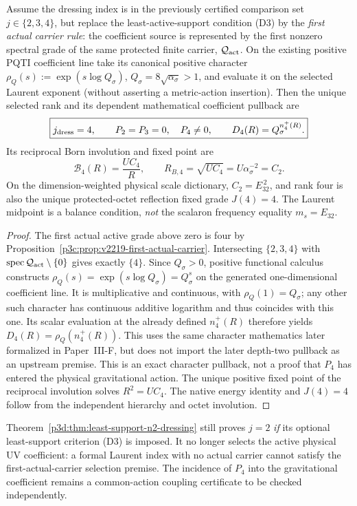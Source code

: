 \documentclass[12pt,a4paper]{article}
\begin{document}
\begin{theorem}
\label{p3d:thm:v2219-carrier-four-dressing}
Assume the dressing index is in the previously certified comparison set
$j\in\{2,3,4\}$, but replace the least-active-support condition (D3) by
the \emph{first actual carrier rule}: the coefficient source is represented
by the first nonzero spectral grade of the same protected finite carrier,
$\mathcal Q_{\rm act}$. On the existing positive PQTI coefficient
line take its canonical positive character
$\rho_Q(s):=\exp(s\log Q_\sigma)$, $Q_\sigma=8\sqrt{\alpha_\sigma}>1$,
and evaluate it on the selected Laurent exponent (without asserting a
metric-action insertion). Then the unique selected rank and its dependent
mathematical coefficient pullback are
\[
 \boxed{j_{\rm dress}=4,\qquad P_2=P_3=0,\quad P_4\ne0,
 \qquad D_4(R)=Q_\sigma^{n_4^+(R)}.}
\]
Its reciprocal Born involution and fixed point are
\[
 \mathcal B_4(R)=\frac{UC_4}{R},\qquad
 R_{B,4}=\sqrt{UC_4}=U\alpha_\sigma^{-2}=C_2.
\]
On the dimension-weighted physical scale dictionary,
$C_2=E_{32}^{\,2}$, and rank four is also the unique protected-octet
reflection fixed grade $J(4)=4$.  The Laurent midpoint is a balance
condition, \emph{not} the scalaron frequency equality $m_s=E_{32}$.
\end{theorem}
\begin{proof}
The first actual active grade above zero is four by
Proposition~\ref{p3c:prop:v2219-first-actual-carrier}. Intersecting
\(\{2,3,4\}\) with \(\operatorname{spec}\mathcal Q_{\rm act}\setminus\{0\}\)
gives exactly \(\{4\}\). Since \(Q_\sigma>0\), positive functional calculus constructs
\(\rho_Q(s)=\exp(s\log Q_\sigma)=Q_\sigma^s\) on the generated
one-dimensional coefficient line. It is multiplicative and continuous,
with \(\rho_Q(1)=Q_\sigma\); any other such character has continuous
additive logarithm and thus coincides with this one.
Its scalar evaluation at the already defined \(n_4^+(R)\) therefore
yields \(D_4(R)=\rho_Q(n_4^+(R))\).
This uses the same character mathematics later formalized in Paper~III-F,
but does not import the later depth-two pullback as an upstream premise.
This is an exact character pullback, not a proof that \(P_4\) has
entered the physical gravitational action. The unique positive fixed point
of the reciprocal involution solves \(R^2=UC_4\). The native energy
identity and \(J(4)=4\) follow from the independent hierarchy and octet
involution.
\end{proof}
\begin{remark}
Theorem~\ref{p3d:thm:least-support-n2-dressing} still proves $j=2$
\emph{if} its optional least-support criterion (D3) is imposed.  It no
longer selects the active physical UV coefficient: a formal Laurent index
with no actual carrier cannot satisfy the first-actual-carrier selection
premise.  The incidence of $P_4$ into the gravitational coefficient remains
a common-action coupling certificate to be checked independently.
\end{remark}
\end{document}
